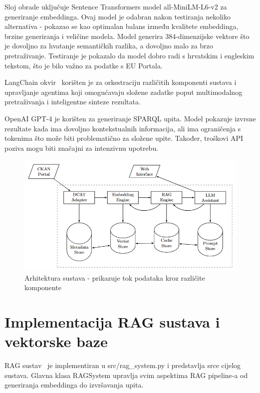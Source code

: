 Sloj obrade uključuje Sentence Transformers model all-MiniLM-L6-v2 za generiranje embeddinga. Ovaj model je odabran nakon testiranja nekoliko alternativa - pokazao se kao optimalan balans između kvalitete embeddinga, brzine generiranja i veličine modela. Model generira 384-dimenzijske vektore što je dovoljno za hvatanje semantičkih razlika, a dovoljno malo za brzo pretraživanje. Testiranje je pokazalo da model dobro radi s hrvatskim i engleskim tekstom, što je bilo važno za podatke s EU Portala.

LangChain okvir~\cite{liu2023survey} korišten je za orkestraciju različitih komponenti sustava i upravljanje agentima koji omogućavaju složene zadatke poput multimodalnog pretraživanja i inteligentne sinteze rezultata.

OpenAI GPT-4 je korišten za generiranje SPARQL upita. Model pokazuje izvrsne rezultate kada ima dovoljno kontekstualnih informacija, ali ima ograničenja s tokenima što može biti problematično za složene upite. Također, troškovi API poziva mogu biti značajni za intenzivnu upotrebu.

\begin{figure}[htbp]
    \centering
    \includegraphics[width=1\textwidth]{figures/system_architecture.png}
    \caption{Arhitektura sustava - prikazuje tok podataka kroz različite komponente}
    \label{fig:system_architecture}
\end{figure}

\section{Implementacija RAG sustava i vektorske baze}

RAG sustav~\cite{lewis2020retrieval} je implementiran u src/rag\_system.py i predstavlja srce cijelog sustava. Glavna klasa RAGSystem upravlja svim aspektima RAG pipeline-a od generiranja embeddinga do izvršavanja upita.

